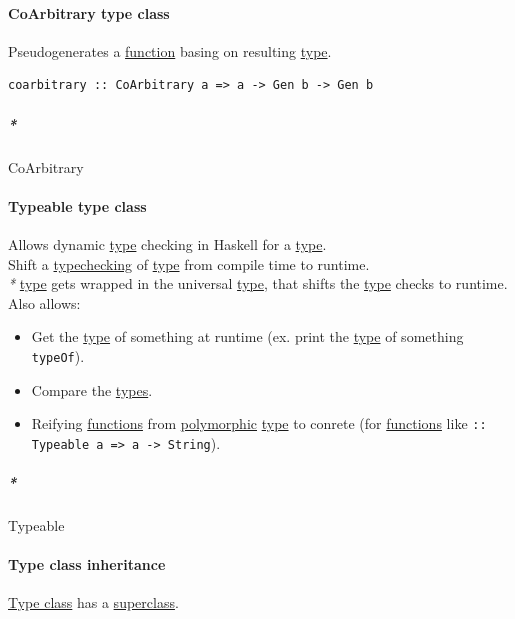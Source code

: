 \documentclass[11pt]{article}
\begin{document}
\paragraph{\label{orgbe337d0}CoArbitrary type class}
\label{sec:org688d27c}
Pseudogenerates a \hyperref[orge15bc14]{function} basing on resulting \hyperref[orgc4aea2f]{type}.\\
\begin{verbatim}
coarbitrary :: CoArbitrary a => a -> Gen b -> Gen b
\end{verbatim}

\subparagraph{\emph{*}}
\label{sec:org40102f6}

\label{orge8b8eab}CoArbitrary\\

\paragraph{\label{org5804d1c}Typeable type class}
\label{sec:orgcbeafea}
Allows dynamic \hyperref[orgc4aea2f]{type} checking in Haskell for a \hyperref[orgc4aea2f]{type}.\\
Shift a \hyperref[org64d9d33]{typechecking} of \hyperref[orgc4aea2f]{type} from compile time to runtime.\\
\emph{*} \hyperref[orgc4aea2f]{type} gets wrapped in the universal \hyperref[orgc4aea2f]{type}, that shifts the \hyperref[orgc4aea2f]{type} checks to runtime.\\

Also allows:\\
\begin{itemize}
\item Get the \hyperref[orgc4aea2f]{type} of something at runtime (ex. print the \hyperref[orgc4aea2f]{type} of something \texttt{typeOf}).\\
\item Compare the \hyperref[org4209edd]{types}.\\
\item Reifying \hyperref[orgaa8fb87]{functions} from \hyperref[orgac4d581]{polymorphic} \hyperref[orgc4aea2f]{type} to conrete (for \hyperref[orgaa8fb87]{functions} like \texttt{:: Typeable a => a -> String}).\\
\end{itemize}

\subparagraph{\emph{*}}
\label{sec:org9ccba50}

\label{org377ed5d}Typeable\\

\paragraph{\label{orgbc87990}Type class inheritance}
\label{sec:orgcb6458d}
\hyperref[org16d8a26]{Type class} has a \hyperref[orgd8749fa]{superclass}.\\
\end{document}
